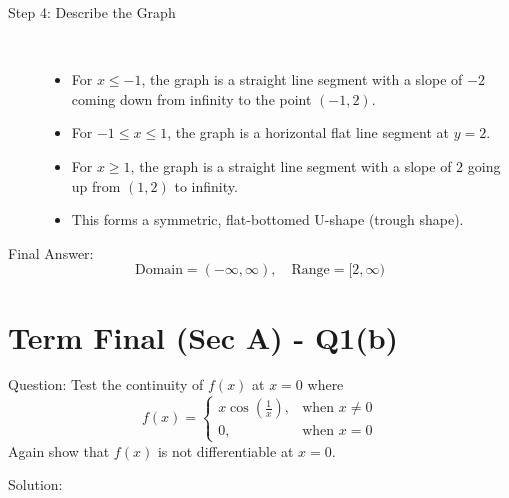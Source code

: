 \documentclass[11pt, a4paper]{article}
\begin{document}
\begin{description}
    \item[Step 4: Describe the Graph] \ 
    \begin{itemize}
        \item For $x \le -1$, the graph is a straight line segment with a slope of $-2$ coming down from infinity to the point $(-1, 2)$.
        \item For $-1 \le x \le 1$, the graph is a horizontal flat line segment at $y = 2$.
        \item For $x \ge 1$, the graph is a straight line segment with a slope of $2$ going up from $(1, 2)$ to infinity.
        \item This forms a symmetric, flat-bottomed U-shape (trough shape).
    \end{itemize}
\end{description}

Final Answer:
\[ 
\boxed{\text{Domain} = (-\infty, \infty), \quad \text{Range} = [2, \infty)} 
\]



\section*{Term Final (Sec A) - Q1(b)}

Question:
Test the continuity of $f(x)$ at $x=0$ where
\[ 
f(x) = \begin{cases} 
x \cos\left(\frac{1}{x}\right), & \text{when } x \neq 0 \\ 
0, & \text{when } x = 0 
\end{cases} 
\]
Again show that $f(x)$ is not differentiable at $x = 0$.

Solution:
\end{document}
